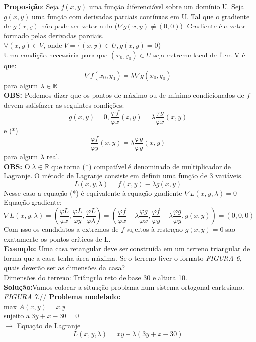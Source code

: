 \documentclass{article}
\begin{document}
		\textbf{Proposição}: Seja $f(x,y)$ uma função diferenciável sobre um domínio U. Seja $g(x,y)$ uma função com derivadas parciais contínuas em U. Tal que o gradiente de $g(x,y)$ não pode ser vetor nulo ($\nabla g(x,y) \neq (0,0)$). Gradiente é o vetor formado pelas derivadas parciais.\\
		$\forall (x,y) \in V$, onde $V = \{(x,y) \in U , g(x,y)=0\}$\\
		Uma condição necessária para que $(x_0,y_0) \in U$ seja extremo local de f em V é que:\\
		$$\nabla f(x_0,y_0) = \lambda \nabla g(x_0,y_0)$$
		para algum $\lambda \in \mathbb{R}$\\
		\textbf{OBS:} Podemos dizer que os pontos de máximo ou de mínimo condicionados de $f$ devem satisfazer as seguintes condições:
		$$g(x,y) = 0, \dfrac{\varphi f}{\varphi x} (x,y) = \lambda \dfrac{\varphi g}{\varphi x}(x,y)$$
		e (*)
		$$\dfrac{\varphi f}{\varphi y}(x,y) = \lambda \dfrac{\varphi g}{\varphi y} (x,y)$$
		para algum $\lambda$ real.\\
		\textbf{OBS:} O $\lambda \in \mathbb{R}$ que torna (*) compatível é denominado de multiplicador de Lagranje.
		O método de Lagranje consiste em definir uma função de 3 variáveis.
		$$L(x,y,\lambda)=f(x,y)-\lambda g(x,y)$$
		Nesse caso a equação (*) é equivalente à equação gradiente $\nabla L (x,y,\lambda)=0$\\
		Equação gradiente:
		$$\nabla L (x,y,\lambda) = ( \dfrac{\varphi L}{\varphi x}, \dfrac{\varphi L}{\varphi y}, \dfrac{\varphi L}{\varphi \lambda})=(\dfrac{\varphi f}{\varphi x}-\lambda \dfrac{\varphi g}{\varphi x}, \dfrac{\varphi f}{\varphi y}- \lambda \dfrac{\varphi g}{\varphi y}, g(x,y))=(0,0,0)$$
		Com isso os candidatos a extremos de $f$ sujeitos à restrição $g(x,y) = 0$ são exatamente os pontos críticos de L.\\
		\textbf{Exemplo:} Uma casa retangular deve ser construída em um terreno triangular de forma que a casa tenha área máxima. Se o terreno tiver o formato \textit{FIGURA 6}, quais deverão ser as dimensões da casa?\\
		Dimensões do terreno: Triângulo reto de base 30 e altura 10.\\
		\textbf{Solução:}Vamos colocar a situação problema num sistema ortogonal cartesiano. \textit{FIGURA 7}.//
		\textbf{Problema modelado:}\\
		max $A(x,y) = x.y$\\
		sujeito a $ 3y+x-30=0$\\
		$\to$ Equação de Lagranje
		$$L(x,y,\lambda)=xy-\lambda(3y+x-30)$$
\end{document}
